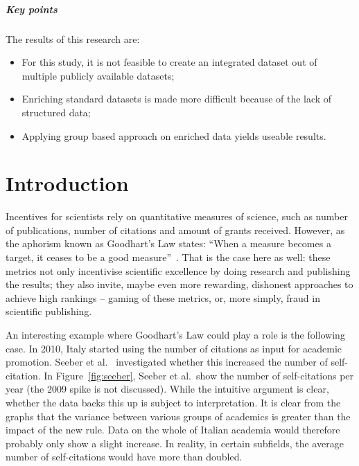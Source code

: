 \documentclass{ou-report}
\newcommand{\outline}[1]{{\color{blue} #1}}
\begin{document}
\paragraph{Key points}
The results of this research are:
\begin{itemize}
    \item For this study, it is not feasible to create an integrated dataset out
    of multiple publicly available datasets;
    \item Enriching standard datasets is made more difficult because of the 
    lack of structured data;
    \item Applying group based approach on enriched data yields useable results.
\end{itemize}


\chapter{Introduction}
Incentives for scientists rely on quantitative measures of science, such as 
number of publications, number of citations and amount of grants received. 
However, as the aphorism known as Goodhart's Law states: ``When a measure 
becomes a target, it ceases to be a good measure''~\cite{strathern_1997}. That 
is the case here as well: these metrics not only incentivise scientific 
excellence by doing research and publishing the results; they also invite, 
maybe even more rewarding, dishonest approaches to achieve high rankings 
-- gaming of these metrics, or, more simply, fraud in scientific publishing. 

An interesting example where Goodhart's Law could play a role is the following
case. In 2010, Italy started using the number of citations as input for academic
promotion. Seeber et al.~\cite{SEEBER2019478} investigated whether this increased
the number of  self-citation. In Figure~\ref{fig:seeber}, Seeber et
al.~show the number of self-citations per year (the 2009 spike is not discussed).
While the intuitive argument is clear, whether the data backs this up is subject
to interpretation. It is clear from the graphs that the variance between various
groups of academics is greater than the impact of the new rule. Data on the whole
of Italian academia would therefore probably only show a slight increase. In
reality, in certain subfields, the average number of self-citations would have more
than doubled.
\end{document}
